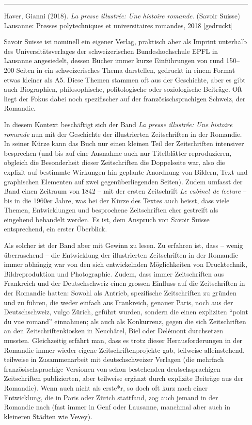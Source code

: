 \documentclass[a4paper,
fontsize=11pt,
oneside,
numbers=noperiodatend,
parskip=half-,
bibliography=totoc,
final
]{scrartcl}
\begin{document}
\begin{center}\rule{0.5\linewidth}{0.5pt}\end{center}

Haver, Gianni (2018). \emph{La presse illustrée: Une histoire romande}.
(Savoir Suisse) Lausanne: Presses polytechniques et universitaires
romandes, 2018 {[}gedruckt{]}

Savoir Suisse ist nominell ein eigener Verlag, praktisch aber als
Imprint unterhalb des Universitätsverlages der schweizerischen
Bundeshochschule EPFL in Lausanne angesiedelt, dessen Bücher immer kurze
Einführungen von rund 150--200 Seiten in ein schweizerisches Thema
darstellen, gedruckt in einem Format etwas kleiner als A5. Diese Themen
stammen oft aus der Geschichte, aber es gibt auch Biographien,
philosophische, politologische oder soziologische Beiträge. Oft liegt
der Fokus dabei noch spezifischer auf der französischsprachigen Schweiz,
der Romandie.

In diesem Kontext beschäftigt sich der Band \emph{La presse illustrée:
Une histoire romande} nun mit der Geschichte der illustrierten
Zeitschriften in der Romandie. In seiner Kürze kann das Buch nur einen
kleinen Teil der Zeitschriften intensiver besprechen (und bis auf eine
Ausnahme auch nur Titelblätter reproduzieren, obgleich die Besonderheit
dieser Zeitschriften die Doppelseite war, also die explizit auf
bestimmte Wirkungen hin geplante Anordnung von Bildern, Text und
graphischen Elementen auf zwei gegenüberliegenden Seiten). Zudem umfasst
der Band einen Zeitraum von 1842 -- mit der ersten Zeitschrift \emph{Le
cabinet de lecture} -- bis in die 1960er Jahre, was bei der Kürze des
Textes auch heisst, dass viele Themen, Entwicklungen und besprochene
Zeitschriften eher gestreift als eingehend behandelt werden. Es ist, dem
Anspruch von Savoir Suisse entsprechend, ein erster Überblick.

Als solcher ist der Band aber mit Gewinn zu lesen. Zu erfahren ist, dass
-- wenig überraschend -- die Entwicklung der illustrierten Zeitschriften
in der Romandie immer abhängig war von den sich entwickelnden
Möglichkeiten von Drucktechnik, Bildreproduktion und Photographie.
Zudem, dass immer Zeitschriften aus Frankreich und der Deutschschweiz
einen grossen Einfluss auf die Zeitschriften in der Romandie hatten:
Sowohl als Antrieb, spezifische Zeitschriften zu gründen und zu führen,
die weder einfach aus Frankreich, genauer Paris, noch aus der
Deutschschweiz, vulgo Zürich, geführt wurden, sondern die einen
expliziten \enquote{point du vue romand} einnahmen; als auch als
Konkurrenz, gegen die sich Zeitschriften an den Zeitschriftenkiosken in
Neuchâtel, Biel oder Delémont durchsetzen mussten. Gleichzeitig erfährt
man, dass es trotz dieser Herausforderungen in der Romandie immer wieder
eigene Zeitschriftenprojekte gab, teilweise alleinstehend, teilweise in
Zusammenarbeit mit deutschschweizer Verlagen (die mehrfach
französischsprachige Versionen von schon bestehenden deutschsprachigen
Zeitschriften publizierten, aber teilweise ergänzt durch explizite
Beiträge aus der Romandie). Wenn auch nicht als erste*r, so doch oft
kurz nach einer Entwicklung, die in Paris oder Zürich stattfand, zog
auch jemand in der Romandie nach (fast immer in Genf oder Lausanne,
manchmal aber auch in kleineren Städten wie Vevey).
\end{document}
